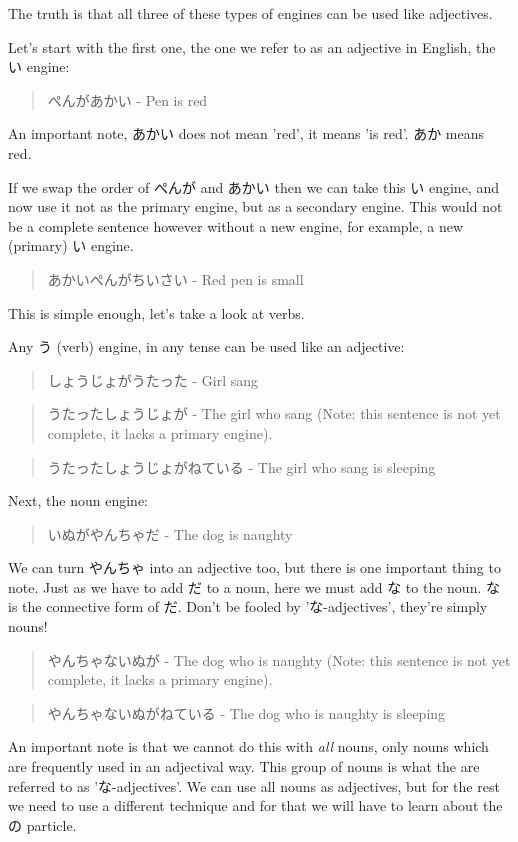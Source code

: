 \documentclass[11pt]{article}
\begin{document}
The truth is that all three of these types of engines can be used like adjectives.

Let's start with the first one, the one we refer to as an adjective in English, the い engine:
\begin{quote}
ぺんがあかい - Pen is red
\end{quote}
An important note, あかい does not mean 'red', it means 'is red'. あか means red.

If we swap the order of ぺんが and あかい then we can take this い engine, and now use it not as the primary engine, but as a secondary engine. This would not be a complete sentence however without a new engine, for example, a new (primary) い engine.
\begin{quote}
あかいぺんがちいさい - Red pen is small
\end{quote}
This is simple enough, let's take a look at verbs.

Any う (verb) engine, in any tense can be used like an adjective:
\begin{quote}
しょうじょがうたった - Girl sang
\end{quote}
\begin{quote}
うたったしょうじょが - The girl who sang (Note: this sentence is not yet complete, it lacks a primary engine).
\end{quote}
\begin{quote}
うたったしょうじょがねている - The girl who sang is sleeping
\end{quote}

Next, the noun engine:
\begin{quote}
いぬがやんちゃだ - The dog is naughty
\end{quote}
We can turn やんちゃ into an adjective too, but there is one important thing to note. Just as we have to add だ to a noun, here we must add な to the noun. な is the connective form of だ. Don't be fooled by 'な-adjectives', they're simply nouns!
\begin{quote}
やんちゃないぬが - The dog who is naughty (Note: this sentence is not yet complete, it lacks a primary engine).
\end{quote}
\begin{quote}
やんちゃないぬがねている - The dog who is naughty is sleeping
\end{quote}

An important note is that we cannot do this with \emph{all} nouns, only nouns which are frequently used in an adjectival way. This group of nouns is what the are referred to as 'な-adjectives'. We can use all nouns as adjectives, but for the rest we need to use a different technique and for that we will have to learn about the の particle.
\end{document}
